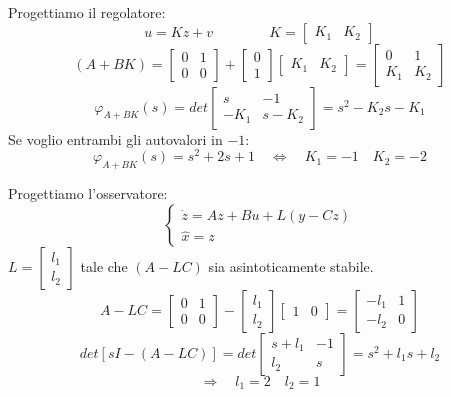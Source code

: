 \documentclass[../main.tex]{subfiles}
\begin{document}
\begin{mdframed}[style=Exercise]
\begin{Exercise}[title={Stabilizzazione di un sistema con osservatore}, difficulty=1]
				Progettiamo il regolatore:
				\[
					u = Kz + v \qquad\qquad K =
					\begin{bmatrix}
						K_1 & K_2
					\end{bmatrix}
				\]
				\[
					(A+BK) =
					\begin{bmatrix}
						0 & 1\\
						0 & 0
					\end{bmatrix} +
					\begin{bmatrix}
						0\\
						1
					\end{bmatrix}
					\begin{bmatrix}
						K_1 & K_2
					\end{bmatrix} =
					\begin{bmatrix}
						0 & 1\\
						K_1 & K_2
					\end{bmatrix}
				\]
				\[
					\varphi_{A+BK}(s) = det
					\begin{bmatrix}
						s & -1\\
						-K_1 & s-K_2
					\end{bmatrix} = s^2 - K_2s - K_1
				\]
				Se voglio entrambi gli autovalori in $ -1 $:
				\[
					\varphi_{A+BK}(s) = s^2 + 2s + 1 \quad\Leftrightarrow\quad K_1 = -1 \quad K_2 = -2
				\]
				
				Progettiamo l'osservatore:
				\[
					\begin{cases}
						\dot z = Az + Bu +L(y-Cz)\\
						\hat x = z
					\end{cases}
				\]
				$ L = \begin{bmatrix} l_1 \\ l_2 \end{bmatrix} $ tale che $ (A-LC) $ sia asintoticamente stabile.
				\[
					A-LC = 
					\begin{bmatrix}
						0 & 1\\
						0 & 0
					\end{bmatrix} -
					\begin{bmatrix}
						l_1\\
						l_2
					\end{bmatrix}
					\begin{bmatrix}
						1 & 0
					\end{bmatrix} = 
					\begin{bmatrix}
						-l_1 & 1\\
						-l_2 & 0
					\end{bmatrix}
				\]
				\[
					det\left[ sI - (A-LC) \right] = det 
					\begin{bmatrix}
						s+l_1 & -1\\
						l_2 & s
					\end{bmatrix} = s^2 + l_1 s + l_2
				\]
				\[
					\Rightarrow\quad l_1 = 2 \quad l_2 = 1
				\]
			\end{Exercise}
		\end{mdframed}
\end{document}
